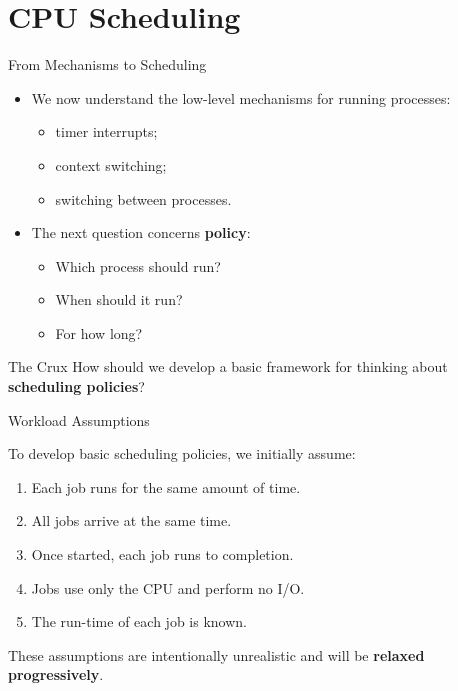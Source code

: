 
\section{CPU Scheduling}

\begin{frame}{From Mechanisms to Scheduling}

\begin{itemize}
    \item We now understand the low-level mechanisms for running processes:
    \begin{itemize}
        \item timer interrupts;
        \item context switching;
        \item switching between processes.
    \end{itemize}

    \item The next question concerns \textbf{policy}:
    \begin{itemize}
        \item Which process should run?
        \item When should it run?
        \item For how long?
    \end{itemize}
\end{itemize}

\begin{block}{The Crux}
How should we develop a basic framework for thinking about
\textbf{scheduling policies}?
\end{block}

\end{frame}

\begin{frame}{Workload Assumptions}

To develop basic scheduling policies, we initially assume:

\begin{enumerate}
    \item Each job runs for the same amount of time.
    \item All jobs arrive at the same time.
    \item Once started, each job runs to completion.
    \item Jobs use only the CPU and perform no I/O.
    \item The run-time of each job is known.
\end{enumerate}

\medskip

These assumptions are intentionally unrealistic and will be
\textbf{relaxed progressively}.

\end{frame}

